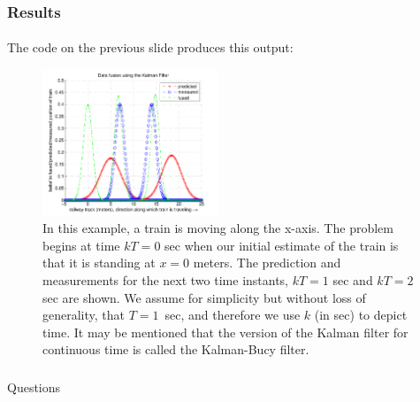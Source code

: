 \begin{frame}\pw\Large
\frametitle{Results}
\framesubtitle{}
The code on the previous slide produces this output:
\begin{figure}[h]
\centering
\includegraphics[width=0.47\textwidth]{figs/CONTROLS_Kalman_train_example.pdf}
\caption{\tiny In this example, a train is moving along the x-axis.  The problem begins at time $kT=0$ sec when our initial estimate of the train is that it is standing at $x=0$ meters.  The prediction and measurements for the next two time instants, $kT=1$ sec and $kT=2$ sec are shown.  We assume for simplicity but without loss of generality, that $T=1$~sec, and therefore we use $k$ (in sec) to depict time.  It may be mentioned that the version of the Kalman filter for continuous time is called the Kalman-Bucy filter.}
\end{figure}
\end{frame}


\appendix
\begin{frame}\Large
\frametitle{}
\framesubtitle{}
Questions
\end{frame}


